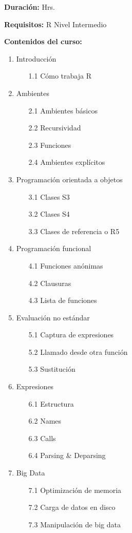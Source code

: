 \documentclass[12pt,a4paper,oneside]{article}\usepackage[]{graphicx}\usepackage[]{color}
\begin{document}
{\bf \large Duración:} Hrs.
  
{\bf \large Requisitos:}\newline
  R Nivel Intermedio
  
{\bf \large Contenidos del curso:}

\begin{enumerate}
  \item {\Large Introducción}
  \begin{enumerate}
    \item[1.1] Cómo trabaja R
  \end{enumerate}
  \item {\Large Ambientes}
  \begin{enumerate}
    \item[2.1] Ambientes básicos
    \item[2.2] Recursividad
    \item[2.3] Funciones
    \item[2.4] Ambientes explícitos
  \end{enumerate}
  \item {\Large Programación orientada a objetos}
  \begin{enumerate}
    \item[3.1] Clases S3
    \item[3.2] Clases S4
    \item[3.3] Clases de referencia o R5
  \end{enumerate}
  \item {\Large Programación funcional}
    \begin{enumerate}
    \item[4.1] Funciones anónimas
    \item[4.2] Clausuras
    \item[4.3] Lista de funciones
  \end{enumerate}
  \item {\Large Evaluación no estándar}
  \begin{enumerate}
    \item[5.1] Captura de expresiones
    \item[5.2] Llamado desde otra función
    \item[5.3] Sustitución
  \end{enumerate}
  \item {\Large Expresiones}
    \begin{enumerate}
    \item[6.1] Estructura
    \item[6.2] Names
    \item[6.3] Calls
    \item[6.4] Parsing $\&$ Deparsing
  \end{enumerate}
    \item {\Large Big Data}
    \begin{enumerate}
    \item[7.1] Optimización de memoria
    \item[7.2] Carga de datos en disco
    \item[7.3] Manipulación de big data
  \end{enumerate}
\end{enumerate}
\end{document}

